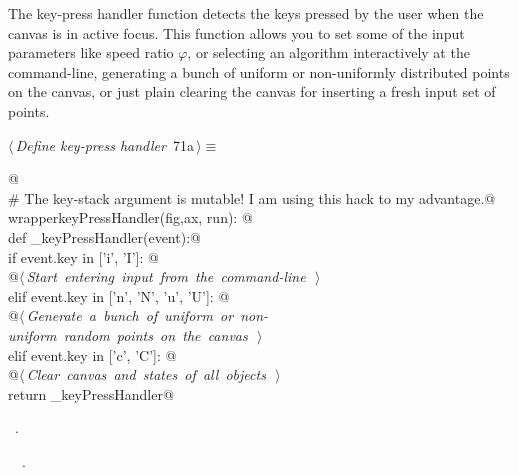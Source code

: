\documentclass[11.5pt]{report}
\begin{document}
\vspace{-0.8cm}\newchunk The key-press handler function detects the keys pressed by the user when the canvas
is in active focus. This function allows you to set some of the input parameters like 
speed ratio $\varphi$, or selecting an algorithm interactively at the command-line, 
generating a bunch of uniform or non-uniformly distributed points on the canvas, 
or just plain clearing the canvas for inserting a fresh input set of points. 

\begin{flushleft} \small
\begin{minipage}{\linewidth}\label{scrap102}\raggedright\small
{} $\langle\,${\itshape Define key-press handler}\nobreak\ {\footnotesize {71a}}$\,\rangle\equiv$
\vspace{-1ex}
\begin{list}{}{} \item
\mbox{}\verb@   @\\
\mbox{}\verb@# The key-stack argument is mutable! I am using this hack to my advantage.@\\
\mbox{}\verb@def wrapperkeyPressHandler(fig,ax, run): @\\
\mbox{}\verb@       def _keyPressHandler(event):@\\
\mbox{}\verb@           if event.key in ['i', 'I']:  @\\
\mbox{}\verb@                @\hbox{$\langle\,${\itshape Start entering input from the command-line}\nobreak\ {\footnotesize {}}$\,\rangle$}\verb@@\\
\mbox{}\verb@           elif event.key in ['n', 'N', 'u', 'U']: @\\
\mbox{}\verb@                @\hbox{$\langle\,${\itshape Generate a bunch of uniform or non-uniform random points on the canvas}\nobreak\ {\footnotesize {}}$\,\rangle$}\verb@@\\
\mbox{}\verb@           elif event.key in ['c', 'C']: @\\
\mbox{}\verb@                @\hbox{$\langle\,${\itshape Clear canvas and states of all objects}\nobreak\ {\footnotesize {}}$\,\rangle$}\verb@@\\
\mbox{}\verb@       return _keyPressHandler@\\
\mbox{}\verb@@{\NWsep}
\end{list}
\vspace{-1.5ex}
\footnotesize
\begin{list}{}{\setlength{\itemsep}{-\parsep}\setlength{\itemindent}{-\leftmargin}}
\item \NWtxtMacroRefIn\ .
\item \NWtxtIdentsDefed\nobreak\  \verb@wrapperkeyPressHandler@\nobreak\ .
\item{}
\end{list}
\end{minipage}\vspace{4ex}
\end{flushleft}
\end{document}
